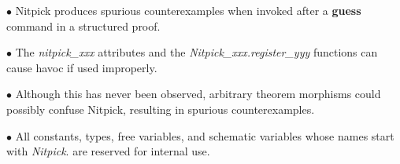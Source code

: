 \documentclass[a4paper,12pt]{article}
\begin{document}
\begin{enum}
\item[$\bullet$] Nitpick produces spurious counterexamples when invoked after a
\textbf{guess} command in a structured proof.

\item[$\bullet$] The \textit{nitpick\_xxx} attributes and the
\textit{Nitpick\_xxx.register\_yyy} functions can cause havoc if used
improperly.

\item[$\bullet$] Although this has never been observed, arbitrary theorem
morphisms could possibly confuse Nitpick, resulting in spurious counterexamples.

\item[$\bullet$] All constants, types, free variables, and schematic variables
whose names start with \textit{Nitpick}{.} are reserved for internal use.
\end{enum}

\let\em=\sl
{}

\end{document}
